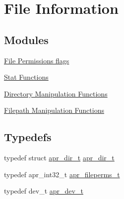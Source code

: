 \hypertarget{group__apr__file__info}{}\section{File Information}
\label{group__apr__file__info}
\subsection*{Modules}
\begin{DoxyCompactItemize}
\item 
\hyperlink{group__apr__file__permissions}{File Permissions flags}
\item 
\hyperlink{group__apr__file__stat}{Stat Functions}
\item 
\hyperlink{group__apr__dir}{Directory Manipulation Functions}
\item 
\hyperlink{group__apr__filepath}{Filepath Manipulation Functions}
\end{DoxyCompactItemize}
\subsection*{Typedefs}
\begin{DoxyCompactItemize}
\item 
typedef struct \hyperlink{group__apr__file__info_ga92ed8cf52cba2abb42cf74087aa74da8}{apr\+\_\+dir\+\_\+t} \hyperlink{group__apr__file__info_ga92ed8cf52cba2abb42cf74087aa74da8}{apr\+\_\+dir\+\_\+t}
\item 
typedef apr\+\_\+int32\+\_\+t \hyperlink{group__apr__file__info_ga3af19c4c47007169064a70f9351bc7d8}{apr\+\_\+fileperms\+\_\+t}
\item 
typedef dev\+\_\+t \hyperlink{group__apr__file__info_gae2c25c4b679613081599f776efa96c4a}{apr\+\_\+dev\+\_\+t}
\end{DoxyCompactItemize}
